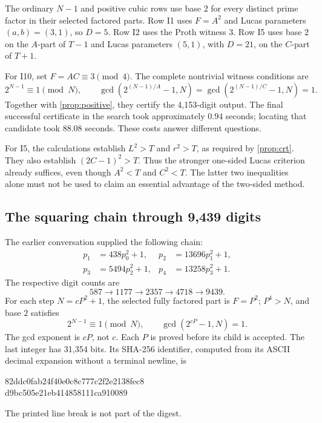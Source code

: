 \documentclass[11pt,a4paper]{article}
\theoremstyle{definition}\newtheorem{definition}[theorem]{Definition}
\theoremstyle{remark}\newtheorem{remark}[theorem]{Remark}
\begin{document}
The ordinary $N-1$ and positive cubic rows use base $2$ for every distinct
prime factor in their selected factored parts. Row I1 uses $F=A^2$ and Lucas
parameters $(a,b)=(3,1)$, so $D=5$. Row I2 uses the Proth witness $3$.
Row I5 uses base $2$ on the $A$-part of $T-1$ and Lucas parameters $(5,1)$,
with $D=21$, on the $C$-part of $T+1$.

For I10, set $F=AC\equiv3\pmod4$. The complete nontrivial witness conditions
are
\[
 2^{N-1}\equiv1\pmod N,\qquad
 \gcd(2^{(N-1)/A}-1,N)=\gcd(2^{(N-1)/C}-1,N)=1.
\]
Together with \cref{prop:positive}, they certify the 4,153-digit output.
The final successful certificate in the search took approximately $0.94$
seconds; locating that candidate took $88.08$ seconds. These costs answer
different questions.

For I5, the calculations establish $L^2>T$ and $r^2>T$, as required by
\cref{prop:crt}. They also establish $(2C-1)^2>T$. Thus the stronger one-sided
Lucas criterion already suffices, even though $A^2<T$ and $C^2<T$. The latter
two inequalities alone must not be used to claim an essential advantage of
the two-sided method.

\subsection{The squaring chain through 9,439 digits}
\label{sec:chain}

The earlier conversation supplied the following chain:
\begin{align*}
 p_1&=438p_0^2+1,& p_2&=13696p_1^2+1,\\
 p_3&=5494p_2^2+1,& p_4&=13258p_3^2+1.
\end{align*}
The respective digit counts are
\[
 587\longrightarrow1177\longrightarrow2357\longrightarrow4718
 \longrightarrow9439.
\]
For each step $N=cP^2+1$, the selected fully factored part is $F=P^2$;
$P^4>N$, and base $2$ satisfies
\begin{equation}\label{eq:chain-cert}
 2^{N-1}\equiv1\pmod N,\qquad \gcd(2^{cP}-1,N)=1.
\end{equation}
The gcd exponent is $cP$, not $c$. Each $P$ is proved before its child is
accepted. The last integer has 31,354 bits. Its SHA-256 identifier, computed
from its ASCII decimal expansion without a terminal newline, is
\begin{center}\footnotesize\ttfamily
82ddc0fab24f40e0c8c777c2f2e2138fec8\\
d9bc505e21eb414858111ca910089
\end{center}
The printed line break is not part of the digest.
\end{document}
